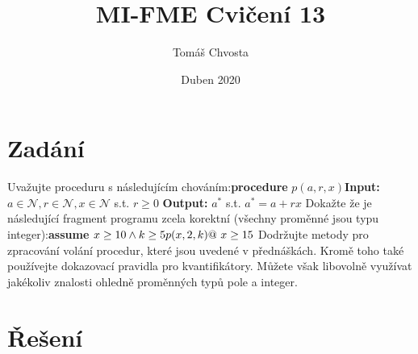 \documentclass{article}
\title{MI-FME Cvičení 13}
\author{Tomáš Chvosta}
\date{Duben 2020}
\begin{document}
\maketitle

\section{Zadání}
Uvažujte proceduru s následujícím chováním:\newline\newline \textbf{procedure} $p(a, r, x)$\newline \textbf{Input:} $a \in \mathcal{N}, r \in \mathcal{N}, x \in \mathcal{N}$ s.t. $r \geq 0$ \newline \textbf{Output:} $a^*$ s.t. $a^* = a + rx$ \newline\newline Dokažte že je následující fragment programu zcela korektní (všechny proměnné jsou typu integer):\newline\newline \textbf{assume} $x \geq 10 \wedge k \geq 5 \newline p(x, 2, k) \newline @\ x \geq 15$ \newline\newline Dodržujte metody pro zpracování volání procedur, které jsou uvedené v přednáškách. Kromě toho také používejte dokazovací pravidla pro kvantifikátory. Můžete však libovolně využívat jakékoliv znalosti ohledně proměnných typů pole a integer.

\section{Řešení}
\end{document}
